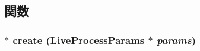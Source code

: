 \subsection{関数}
\hypertarget{classLiveProcess_aacabc29a5ca2191f72591aaf7ffaba64}{
\subsubsection[{create}]{ $\ast$ create (LiveProcessParams $\ast$ {\em params})}}
\label{classLiveProcess_aacabc29a5ca2191f72591aaf7ffaba64}



